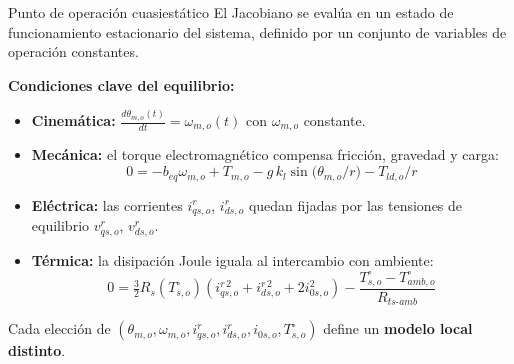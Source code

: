 \documentclass[aspectratio=169,t]{beamer}
\begin{document}
\begin{frame}{Punto de operación cuasiestático}
{\small\color{uncGray}El Jacobiano se evalúa en un estado de funcionamiento estacionario del sistema, definido por un conjunto de variables de operación constantes.}\par
\vspace{3mm}

\textbf{Condiciones clave del equilibrio:}
\begin{itemize}
  \item \textbf{Cinemática:} $\frac{d\theta_{m,o}(t)}{dt}=\omega_{m,o}(t)$ con $\omega_{m,o}$ constante.
  \item \textbf{Mecánica:} el torque electromagnético compensa fricción, gravedad y carga:
  \[
  0=-b_{eq}\omega_{m,o}+T_{m,o}-g\,k_l\sin\!\big(\theta_{m,o}/r\big)-T_{ld,o}/r
  \]
  \item \textbf{Eléctrica:} las corrientes $i_{qs,o}^r$, $i_{ds,o}^r$ quedan fijadas por las tensiones de equilibrio $v_{qs,o}^r$, $v_{ds,o}^r$.
  \item \textbf{Térmica:} la disipación Joule iguala al intercambio con ambiente:
  \[
  0=\tfrac{3}{2}R_s(T_{s,o}^\circ)\!\left(i_{qs,o}^{r\,2}+i_{ds,o}^{r\,2}+2i_{0s,o}^{2}\right)-\frac{T_{s,o}^\circ-T_{amb,o}^\circ}{R_{ts\text{-}amb}}
  \]
\end{itemize}

{\small Cada elección de $(\theta_{m,o},\omega_{m,o},i_{qs,o}^r,i_{ds,o}^r,i_{0s,o},T_{s,o}^\circ)$ define un \textbf{modelo local distinto}.}
\end{frame}
\end{document}
